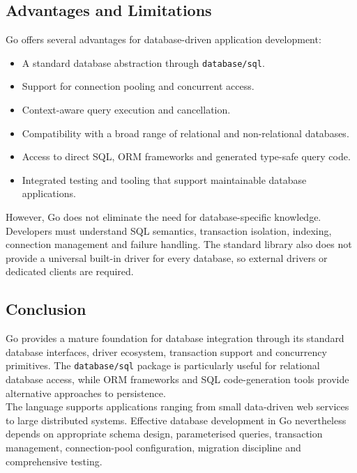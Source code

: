 \subsection{Advantages and Limitations}

Go offers several advantages for database-driven application development:

\begin{itemize}
    \item A standard database abstraction through \texttt{database/sql}.
    \item Support for connection pooling and concurrent access.
    \item Context-aware query execution and cancellation.
    \item Compatibility with a broad range of relational and non-relational databases.
    \item Access to direct SQL, ORM frameworks and generated type-safe query code.
    \item Integrated testing and tooling that support maintainable database applications.
\end{itemize}

However, Go does not eliminate the need for database-specific knowledge. Developers must understand SQL semantics, transaction isolation, indexing, connection management and failure handling. The standard library also does not provide a universal built-in driver for every database, so external drivers or dedicated clients are required.

\subsection{Conclusion}

Go provides a mature foundation for database integration through its standard database interfaces, driver ecosystem, transaction support and concurrency primitives. The \texttt{database/sql} package is particularly useful for relational database access, while ORM frameworks and SQL code-generation tools provide alternative approaches to persistence.\\

The language supports applications ranging from small data-driven web services to large distributed systems. Effective database development in Go nevertheless depends on appropriate schema design, parameterised queries, transaction management, connection-pool configuration, migration discipline and comprehensive testing.




